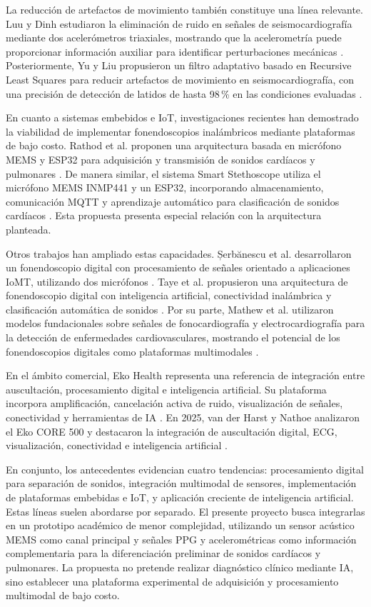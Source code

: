 La reducción de artefactos de movimiento también constituye una línea relevante. Luu y Dinh estudiaron la eliminación de ruido en señales de seismocardiografía mediante dos acelerómetros triaxiales, mostrando que la acelerometría puede proporcionar información auxiliar para identificar perturbaciones mecánicas . Posteriormente, Yu y Liu propusieron un filtro adaptativo basado en Recursive Least Squares para reducir artefactos de movimiento en seismocardiografía, con una precisión de detección de latidos de hasta 98\,\% en las condiciones evaluadas .

En cuanto a sistemas embebidos e IoT, investigaciones recientes han demostrado la viabilidad de implementar fonendoscopios inalámbricos mediante plataformas de bajo costo. Rathod et al. proponen una arquitectura basada en micrófono MEMS y ESP32 para adquisición y transmisión de sonidos cardíacos y pulmonares . De manera similar, el sistema Smart Stethoscope utiliza el micrófono MEMS INMP441 y un ESP32, incorporando almacenamiento, comunicación MQTT y aprendizaje automático para clasificación de sonidos cardíacos . Esta propuesta presenta especial relación con la arquitectura planteada.

Otros trabajos han ampliado estas capacidades. Șerbănescu et al. desarrollaron un fonendoscopio digital con procesamiento de señales orientado a aplicaciones IoMT, utilizando dos micrófonos . Taye et al. propusieron una arquitectura de fonendoscopio digital con inteligencia artificial, conectividad inalámbrica y clasificación automática de sonidos . Por su parte, Mathew et al. utilizaron modelos fundacionales sobre señales de fonocardiografía y electrocardiografía para la detección de enfermedades cardiovasculares, mostrando el potencial de los fonendoscopios digitales como plataformas multimodales .

En el ámbito comercial, Eko Health representa una referencia de integración entre auscultación, procesamiento digital e inteligencia artificial. Su plataforma incorpora amplificación, cancelación activa de ruido, visualización de señales, conectividad y herramientas de IA . En 2025, van der Harst y Nathoe analizaron el Eko CORE 500 y destacaron la integración de auscultación digital, ECG, visualización, conectividad e inteligencia artificial .

En conjunto, los antecedentes evidencian cuatro tendencias: procesamiento digital para separación de sonidos, integración multimodal de sensores, implementación de plataformas embebidas e IoT, y aplicación creciente de inteligencia artificial. Estas líneas suelen abordarse por separado. El presente proyecto busca integrarlas en un prototipo académico de menor complejidad, utilizando un sensor acústico MEMS como canal principal y señales PPG y acelerométricas como información complementaria para la diferenciación preliminar de sonidos cardíacos y pulmonares. La propuesta no pretende realizar diagnóstico clínico mediante IA, sino establecer una plataforma experimental de adquisición y procesamiento multimodal de bajo costo.

